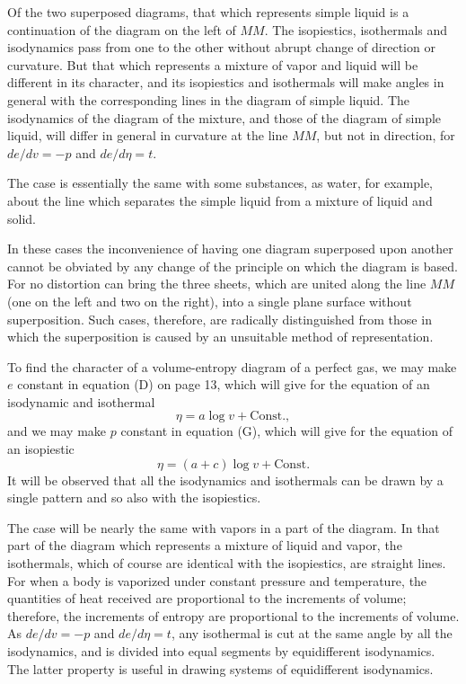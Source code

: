\documentclass[11pt]{article}
\begin{document}
Of the two superposed diagrams, that which represents simple liquid is a continuation of the diagram on the left of $MM$. The isopiestics, isothermals and isodynamics pass from one to the other without abrupt change of direction or curvature. But that which represents a mixture of vapor and liquid will be different in its character, and its isopiestics and isothermals will make angles in general with the corresponding lines in the diagram of simple liquid. The isodynamics of the diagram of the mixture, and those of the diagram of simple liquid, will differ in general in curvature at the line $MM$, but not in direction, for $de/dv=-p$ and $de/d\eta=t$.

The case is essentially the same with some substances, as water, for example, about the line which separates the simple liquid from a mixture of liquid and solid.

In these cases the inconvenience of having one diagram superposed upon another cannot be obviated by any change of the principle on which the diagram is based. For no distortion can bring the three sheets, which are united along the line $MM$ (one on the left and two on the right), into a single plane surface without superposition. Such cases, therefore, are radically distinguished from those in which the superposition is caused by an unsuitable method of representation.

To find the character of a volume-entropy diagram of a perfect gas, we may make $e$ constant in equation (D) on page 13, which will give for the equation of an isodynamic and isothermal
\[
\eta=a\log v+\mathrm{Const.},
\]
and we may make $p$ constant in equation (G), which will give for the equation of an isopiestic
\[
\eta=(a+c)\log v+\mathrm{Const.}
\]
It will be observed that all the isodynamics and isothermals can be drawn by a single pattern and so also with the isopiestics.

The case will be nearly the same with vapors in a part of the diagram. In that part of the diagram which represents a mixture of liquid and vapor, the isothermals, which of course are identical with the isopiestics, are straight lines. For when a body is vaporized under constant pressure and temperature, the quantities of heat received are proportional to the increments of volume; therefore, the increments of entropy are proportional to the increments of volume. As $de/dv=-p$ and $de/d\eta=t$, any isothermal is cut at the same angle by all the isodynamics, and is divided into equal segments by equidifferent isodynamics. The latter property is useful in drawing systems of equidifferent isodynamics.
\end{document}
